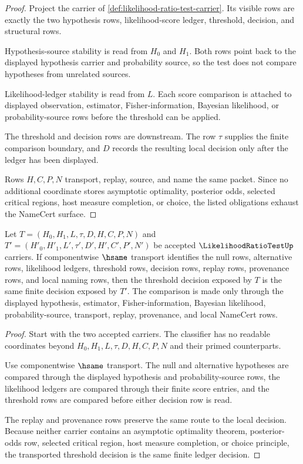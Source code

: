 \begin{proof}
Project the carrier of \autoref{def:likelihood-ratio-test-carrier}. Its visible rows are exactly the two hypothesis rows, likelihood-score ledger, threshold, decision, and structural rows.

Hypothesis-source stability is read from $H_0$ and $H_1$. Both rows point back to the displayed hypothesis carrier and probability source, so the test does not compare hypotheses from unrelated sources.

Likelihood-ledger stability is read from $L$. Each score comparison is attached to displayed observation, estimator, Fisher-information, Bayesian likelihood, or probability-source rows before the threshold can be applied.

The threshold and decision rows are downstream. The row $\tau$ supplies the finite comparison boundary, and $D$ records the resulting local decision only after the ledger has been displayed.

Rows $H,C,P,N$ transport, replay, source, and name the same packet. Since no additional coordinate stores asymptotic optimality, posterior odds, selected critical regions, host measure completion, or choice, the listed obligations exhaust the NameCert surface.
\end{proof}

\begin{theorem}\label{thm:likelihood-ratio-test-finite-ledger-threshold-stability}
Let $T=(H_0,H_1,L,\tau,D,H,C,P,N)$ and $T'=(H'_0,H'_1,L',\tau',D',H',C',P',N')$ be accepted $\LikelihoodRatioTestUp$ carriers. If componentwise $\hsame$ transport identifies the null rows, alternative rows, likelihood ledgers, threshold rows, decision rows, replay rows, provenance rows, and local naming rows, then the threshold decision exposed by $T$ is the same finite decision exposed by $T'$. The comparison is made only through the displayed hypothesis, estimator, Fisher-information, Bayesian likelihood, probability-source, transport, replay, provenance, and local NameCert rows.
\end{theorem}
\begin{proof}
Start with the two accepted carriers. The classifier has no readable coordinates beyond $H_0,H_1,L,\tau,D,H,C,P,N$ and their primed counterparts.

Use componentwise $\hsame$ transport. The null and alternative hypotheses are compared through the displayed hypothesis and probability-source rows, the likelihood ledgers are compared through their finite score entries, and the threshold rows are compared before either decision row is read.

The replay and provenance rows preserve the same route to the local decision. Because neither carrier contains an asymptotic optimality theorem, posterior-odds row, selected critical region, host measure completion, or choice principle, the transported threshold decision is the same finite ledger decision.
\end{proof}


